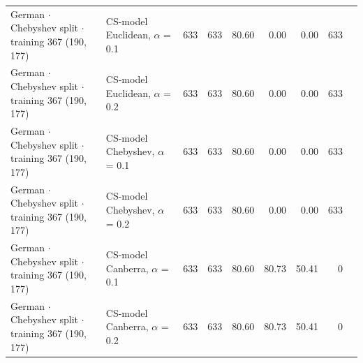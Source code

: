 \begin{longtable}{llrrrrrrl}
  German $\cdot$ Chebyshev split $\cdot$ training 367 (190, 177) & CS-model Euclidean, $\alpha$ = 0.1 & 633 & 633 & 80.60 & 0.00 & 0.00 & 633 &  \\
  German $\cdot$ Chebyshev split $\cdot$ training 367 (190, 177) & CS-model Euclidean, $\alpha$ = 0.2 & 633 & 633 & 80.60 & 0.00 & 0.00 & 633 &  \\
  German $\cdot$ Chebyshev split $\cdot$ training 367 (190, 177) & CS-model Chebyshev, $\alpha$ = 0.1 & 633 & 633 & 80.60 & 0.00 & 0.00 & 633 &  \\
  German $\cdot$ Chebyshev split $\cdot$ training 367 (190, 177) & CS-model Chebyshev, $\alpha$ = 0.2 & 633 & 633 & 80.60 & 0.00 & 0.00 & 633 &  \\
  German $\cdot$ Chebyshev split $\cdot$ training 367 (190, 177) & CS-model Canberra, $\alpha$ = 0.1 & 633 & 633 & 80.60 & 80.73 & 50.41 & 0 &  \\
  German $\cdot$ Chebyshev split $\cdot$ training 367 (190, 177) & CS-model Canberra, $\alpha$ = 0.2 & 633 & 633 & 80.60 & 80.73 & 50.41 & 0 &  \\
\end{longtable}
